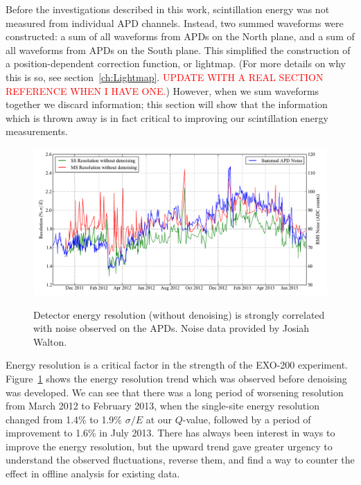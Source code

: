 Before the investigations described in this work, scintillation energy was not measured from individual APD channels.  Instead, two summed waveforms were constructed: a sum of all waveforms from APDs on the North plane, and a sum of all waveforms from APDs on the South plane.  This simplified the construction of a position-dependent correction function, or lightmap.  (For more details on why this is so, see section~\ref{ch:Lightmap}.  \textcolor{red}{UPDATE WITH A REAL SECTION REFERENCE WHEN I HAVE ONE.})  However, when we sum waveforms together we discard information; this section will show that the information which is thrown away is in fact critical to improving our scintillation energy measurements.

\begin{figure}
\begin{center}
\includegraphics[keepaspectratio=true,width=\textwidth]{ResolutionAPDNoiseComparison.pdf}
\end{center}
\renewcommand{\baselinestretch}{1}
\small\normalsize
\begin{quote}
\caption{Detector energy resolution (without denoising) is strongly correlated with noise observed on the APDs.  Noise data provided by Josiah Walton.}
\label{fig:ResolutionAPDNoiseComparison}
\end{quote}
\end{figure}
\renewcommand{\baselinestretch}{2}
\small\normalsize

Energy resolution is a critical factor in the strength of the EXO-200 experiment.  Figure~\ref{fig:ResolutionAPDNoiseComparison} shows the energy resolution trend which was observed before denoising was developed.  We can see that there was a long period of worsening resolution from March 2012 to February 2013, when the single-site energy resolution changed from 1.4\% to 1.9\% $\sigma/E$ at our $Q$-value, followed by a period of improvement to 1.6\% in July 2013.  There has always been interest in ways to improve the energy resolution, but the upward trend gave greater urgency to understand the observed fluctuations, reverse them, and find a way to counter the effect in offline analysis for existing data.

